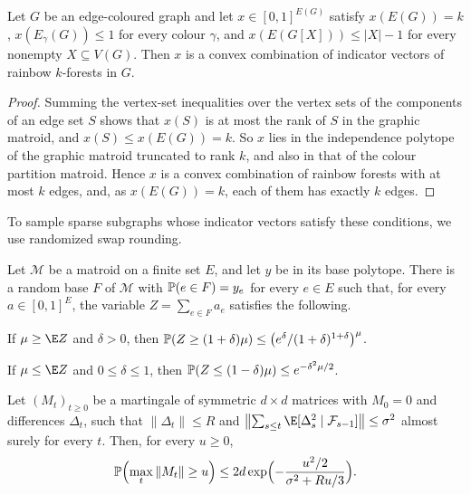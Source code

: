 \begin{lemma}\label{lem:edmonds}
Let $G$ be an edge-coloured graph and let $x\in[0,1]^{E(G)}$ satisfy $x(E(G))=k$, $x(E_\gamma(G))\le1$ for every colour $\gamma$, and $x(E(G[X]))\le|X|-1$ for every nonempty $X\subseteq V(G)$. Then $x$ is a convex combination of indicator vectors of rainbow $k$-forests in $G$.
\end{lemma}
\begin{proof}
Summing the vertex-set inequalities over the vertex sets of the components of an edge set $S$ shows that $x(S)$ is at most the rank of $S$ in the graphic matroid, and $x(S)\le x(E(G))=k$. So $x$ lies in the independence polytope of the graphic matroid truncated to rank $k$, and also in that of the colour partition matroid. Hence $x$ is a convex combination of rainbow forests with at most $k$ edges, and, as $x(E(G))=k$, each of them has exactly $k$ edges.
\end{proof}

To sample sparse subgraphs whose indicator vectors satisfy these conditions, we use randomized swap rounding.

\begin{lemma}\label{lem:cvz}
Let $\mathcal M$ be a matroid on a finite set $E$, and let $y$ be in its base polytope. There is a random base $F$ of $\mathcal M$ with $\mathbb{P}(e\in F)=y_e$ for every $e\in E$ such that, for every $a\in[0,1]^E$, the variable $Z=\sum_{e\in F}a_e$ satisfies the following.
\begin{props}
\item If $\mu\ge\E Z$ and $\delta>0$, then $\mathbb{P}(Z\ge(1+\delta)\mu)\le\bigl(e^\delta/(1+\delta)^{1+\delta}\bigr)^{\mu}$.\label{cvz:upper}
\item If $\mu\le\E Z$ and $0\le\delta\le1$, then $\mathbb{P}(Z\le(1-\delta)\mu)\le e^{-\delta^2\mu/2}$.\label{cvz:lower}
\end{props}
\end{lemma}

\begin{lemma}\label{lem:freedman}
Let $(M_t)_{t\ge0}$ be a martingale of symmetric $d\times d$ matrices with $M_0=0$ and differences $\Delta_t$, such that $\|\Delta_t\|\le R$ and $\bigl\|\sum_{s\le t}\E[\Delta_s^2\mid\mathcal F_{s-1}]\bigr\|\le\sigma^2$ almost surely for every $t$. Then, for every $u\ge0$,
\[
\mathbb{P}\Bigl(\max_t\|M_t\|\ge u\Bigr)\le 2d\exp\Bigl(-\frac{u^2/2}{\sigma^2+Ru/3}\Bigr).
\]
\end{lemma}

